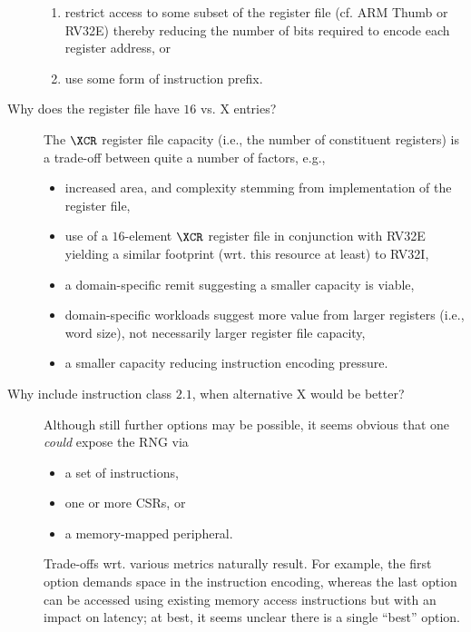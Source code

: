 \begin{description}
      \begin{enumerate}
      \item restrict access to some subset of the register file 
            (cf. ARM Thumb or RV32E) 
            thereby reducing the number of bits required to encode each  
            register address,
            or
      \item use some form of instruction prefix.
      \end{enumerate}

\item[Why does the \XCID register file have $16$ vs. X entries?]
      The $\XCR$ register file capacity (i.e., the number of constituent
      registers) is a trade-off between quite a number of factors, e.g.,

      \begin{itemize}
      \item increased area, and complexity stemming from implementation
            of the register file,
      \item use of a $16$-element $\XCR$ register file in conjunction
            with RV32E~\cite[Section 3]{SCARV:RV:ISA:I:17} yielding a 
            similar footprint (wrt. this resource at least) to RV32I,
      \item a domain-specific remit suggesting a smaller capacity is 
            viable,
      \item   domain-specific workloads suggest more value from larger 
            registers (i.e., word size), not necessarily larger register
            file capacity,
      \item a smaller capacity reducing instruction encoding pressure.
      \end{itemize}

\item[Why include instruction class $2.1$, when alternative X would be better?]
      Although still further options may be possible, it seems obvious
      that one {\em could} expose the RNG via

      \begin{itemize}
      \item a set of instructions,
      \item one or more CSRs,
            or
      \item a memory-mapped peripheral.
      \end{itemize}

      \noindent
      Trade-offs wrt. various metrics naturally result.  For example,
      the first option demands space in the instruction encoding, 
      whereas
      the last  option can be accessed using existing memory access instructions but with an impact on latency;
      at best, it seems unclear there is a single ``best'' option.

\end{description}

